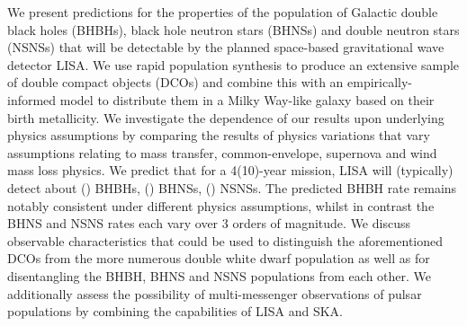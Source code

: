 We present predictions for the properties of the population of Galactic double black holes (BHBHs), black hole neutron stars (BHNSs) and double neutron stars (NSNSs) that will be detectable by the planned space-based gravitational wave detector LISA. We use rapid population synthesis to produce an extensive sample of double compact objects (DCOs) and combine this with an empirically-informed model to distribute them in a Milky Way-like galaxy based on their birth metallicity. We investigate the dependence of our results upon underlying physics assumptions by comparing the results of \nModels{} physics variations that vary assumptions relating to mass transfer, common-envelope, supernova and wind mass loss physics. We predict that for a 4(10)-year mission, LISA will (typically) detect about \BHBHFourYear{}(\BHBHTenYear{}) BHBHs, \BHNSFourYear{}(\BHNSTenYear{}) BHNSs, \NSNSFourYear{}(\NSNSTenYear{}) NSNSs. The predicted BHBH rate remains notably consistent under different physics assumptions, whilst in contrast the BHNS and NSNS rates each vary over 3 orders of magnitude. We discuss observable characteristics that could be used to distinguish the aforementioned DCOs from the more numerous double white dwarf population as well as for disentangling the BHBH, BHNS and NSNS populations from each other. We additionally assess the possibility of multi-messenger observations of pulsar populations by combining the capabilities of LISA and SKA. 